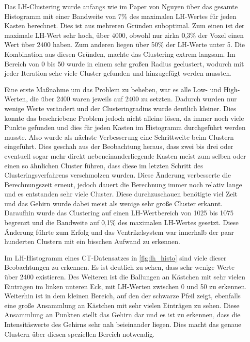 Das LH-Clustering wurde anfangs wie im Paper von Nguyen \cite{nguyen2012clustering} über das gesamte Histogramm mit einer Bandweite von 7\% des maximalen LH-Wertes für jeden Kasten berechnet. Dies ist aus mehreren Gründen suboptimal.
\newline
Zum einen ist der maximale LH-Wert sehr hoch, über 4000, obwohl nur zirka 0,3\% der Voxel einen Wert über 2400 haben. Zum anderen liegen über 50\% der LH-Werte unter 5. Die Kombination aus diesen Gründen, machte das Clustering extrem langsam. Im Bereich von 0 bis 50  wurde in einem sehr großen Radius geclustert, wodurch mit jeder Iteration sehe viele Cluster gefunden und hinzugefügt werden mussten.


Eine erste Maßnahme um das Problem zu beheben, war es alle Low- und High- Werten, die über 2400 waren jeweils auf 2400 zu setzten. Dadurch wurden nur wenige Werte verändert und der Clusteringradius wurde deutlich kleiner. Dies konnte das beschriebene Problem jedoch nicht alleine lösen, da immer noch viele Punkte gefunden und dies für jeden Kasten im Histogramm durchgeführt werden musste.
\newline
Also wurde als nächste Verbesserung eine Schrittweite beim Clustern eingeführt. Dies geschah aus der Beobachtung heraus, dass zwei bis drei oder eventuell sogar mehr direkt nebeneinanderliegende Kasten meist zum selben oder einen so ähnlichen Cluster führen, dass diese im letzten Schritt des Clusteringsverfahrens verschmolzen wurden.
\newline
Diese Änderung verbesserte die Berechnungszeit erneut, jedoch  dauert die Berechnung immer noch relativ lange und es entstanden sehr viele Cluster. Diese durchzuschauen benötigte viel Zeit und das Gehirn wurde dabei meist als wenige sehr große Cluster erkannt.
\newline
Daraufhin wurde das Clustering auf einen LH-Wertbereich von 1025 bis 1075 begrenzt und die Bandweite auf 0,1\% des maximalen LH-Wertes gesetzt. Diese Änderung führte zum Erfolg und das Ventrikelsystem war innerhalb der paar hunderten Clustern mit ein bisschen Aufwand zu erkennen.


Im LH-Histogramm eines CT-Datensatzes in \autoref{fig:lh_histo} sind viele dieser Beobachtungen zu erkennen. Es ist deutlich zu sehen, dass sehr wenige Werte über 2400 existieren. Des Weiteren ist die Ballungen an Kästchen mit sehr vielen Einträgen im linken unteren Eck, mit LH-Werten zwischen  0 und 50 zu erkennen.
\newline
Weiterhin ist in dem kleinen Bereich, auf den der schwarze Pfeil zeigt, ebenfalls eine große Ansammlung an Kästchen mit sehr vielen Einträgen zu sehen. Diese Ansammlung an Punkten stellt das Gehirn dar und es ist zu erkennen, dass die Intensitäswerte des Gehirns sehr nah beieinander liegen.
\newline
Dies macht das genaue Clustern über diesen speziellen Bereich notwendig.

